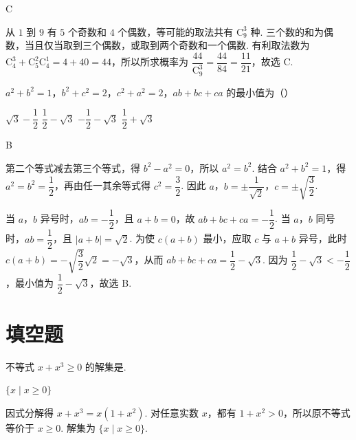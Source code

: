 \begin{answer}
C
\end{answer}

\begin{solution}
从 \(1\) 到 \(9\) 有 \(5\) 个奇数和 \(4\) 个偶数，等可能的取法共有 \(\mathrm C_9^3\) 种. 三个数的和为偶数，当且仅当取到三个偶数，或取到两个奇数和一个偶数. 有利取法数为 \(\mathrm C_4^3+\mathrm C_5^2\mathrm C_4^1=4+40=44\)，所以所求概率为 \(\dfrac{44}{\mathrm C_9^3}=\dfrac{44}{84}=\dfrac{11}{21}\)，故选 C.
\end{solution}

\begin{problem}
\(a^2+b^2=1\)，\(b^2+c^2=2\)，\(c^2+a^2=2\)，\(ab+bc+ca\) 的最小值为（\quad）

\choices
    {\(\sqrt3-\dfrac12\)}
    {\(\dfrac12-\sqrt3\)}
    {\(-\dfrac12-\sqrt3\)}
    {\(\dfrac12+\sqrt3\)}
\end{problem}

\begin{answer}
B
\end{answer}

\begin{solution}
第二个等式减去第三个等式，得 \(b^2-a^2=0\)，所以 \(a^2=b^2\). 结合 \(a^2+b^2=1\)，得 \(a^2=b^2=\dfrac12\)，再由任一其余等式得 \(c^2=\dfrac32\). 因此 \(a\)，\(b=\pm\dfrac1{\sqrt2}\)，\(c=\pm\sqrt{\dfrac32}\).

当 \(a\)，\(b\) 异号时，\(ab=-\dfrac12\)，且 \(a+b=0\)，故 \(ab+bc+ca=-\dfrac12\). 当 \(a\)，\(b\) 同号时，\(ab=\dfrac12\)，且 \(|a+b|=\sqrt2\). 为使 \(c(a+b)\) 最小，应取 \(c\) 与 \(a+b\) 异号，此时 \(c(a+b)=-\sqrt{\dfrac32}\sqrt2=-\sqrt3\)，从而 \(ab+bc+ca=\dfrac12-\sqrt3\). 因为 \(\dfrac12-\sqrt3< -\dfrac12\)，最小值为 \(\dfrac12-\sqrt3\)，故选 B.
\end{solution}

\section{填空题}

\begin{problem}
不等式 \(x+x^3\geqslant0\) 的解集是\fillinblank{}.
\end{problem}

\begin{answer}
\(\{x\mid x\geqslant0\}\)
\end{answer}

\begin{solution}
因式分解得 \(x+x^3=x(1+x^2)\). 对任意实数 \(x\)，都有 \(1+x^2>0\)，所以原不等式等价于 \(x\geqslant0\). 解集为 \(\{x\mid x\geqslant0\}\).
\end{solution}

